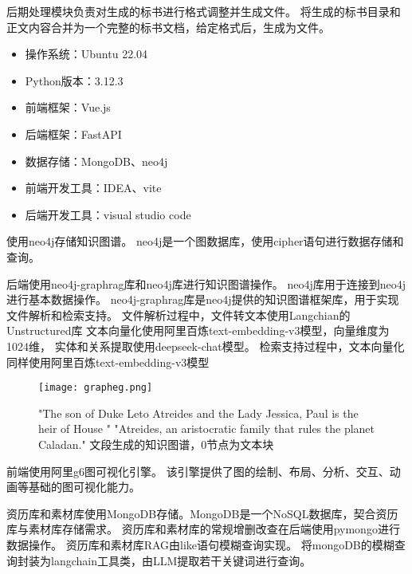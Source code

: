 \documentclass{xmu}
\begin{document}
后期处理模块负责对生成的标书进行格式调整并生成文件。
将生成的标书目录和正文内容合并为一个完整的标书文档，给定格式后，生成为文件。
    \begin{itemize}
        \item 操作系统：Ubuntu 22.04
        \item Python版本：3.12.3
    \end{itemize}
    \begin{itemize}
        \item 前端框架：Vue.js
        \item 后端框架：FastAPI
        \item 数据存储：MongoDB、neo4j
    \end{itemize}
    \begin{itemize}
        \item 前端开发工具：IDEA、vite
        \item 后端开发工具：visual studio code
    \end{itemize}
    使用neo4j存储知识图谱。
    neo4j是一个图数据库，使用cipher语句进行数据存储和查询。\par
    后端使用neo4j-graphrag库和neo4j库进行知识图谱操作。
    neo4j库用于连接到neo4j进行基本数据操作。
    neo4j-graphrag库是neo4j提供的知识图谱框架库，用于实现文件解析和检索支持。
    文件解析过程中，文件转文本使用Langchian的Unstructured库
    文本向量化使用阿里百炼text-embedding-v3模型，向量维度为1024维，
    实体和关系提取使用deepseek-chat模型。
    检索支持过程中，文本向量化同样使用阿里百炼text-embedding-v3模型
    
    \begin{figure}[!htb]
        \centering
        \texttt{[image: grapheg.png]}\\
        \caption{
        "The son of Duke Leto Atreides and the Lady Jessica, Paul is the heir of House "
        "Atreides, an aristocratic family that rules the planet Caladan."
        文段生成的知识图谱，0节点为文本块
        }\label{}
    \end{figure}

    前端使用阿里g6图可视化引擎。
    该引擎提供了图的绘制、布局、分析、交互、动画等基础的图可视化能力。

    资历库和素材库使用MongoDB存储。MongoDB是一个NoSQL数据库，契合资历库与素材库存储需求。
    资历库和素材库的常规增删改查在后端使用pymongo进行数据操作。
    资历库和素材库RAG由like语句模糊查询实现。
    将mongoDB的模糊查询封装为langchain工具类，由LLM提取若干关键词进行查询。
    
\end{document}
